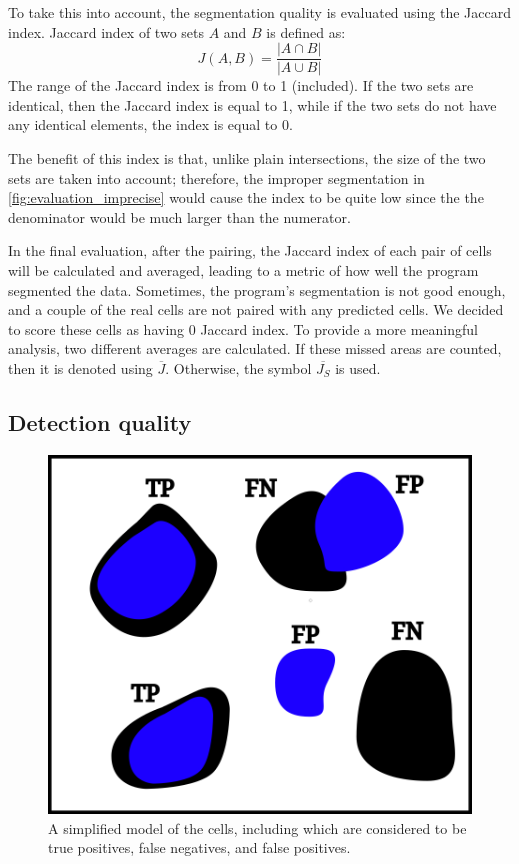 \documentclass[
  digital,     %
  oneside,     %
  nosansbold,  %
  nocolorbold, %
  lof,         %
  lot,         %
]{fithesis4}
\begin{document}
To take this into account, the segmentation quality is evaluated using the
Jaccard index. Jaccard index of two sets $A$ and $B$ is defined
as\cite{2020eelbode}:
$$J(A, B) = \frac{|A \cap B|}{|A \cup B|}$$
The range of the Jaccard index is from 0 to 1 (included). If the two sets are
identical, then the Jaccard index is equal to 1, while if the two sets do not
have any identical elements, the index is equal to 0.

The benefit of this index is that, unlike plain intersections, the size of the two
sets are taken into account; therefore, the improper segmentation in
\ref{fig:evaluation_imprecise} would cause the index to be quite low since the
the denominator would be much larger than the numerator.

In the final evaluation, after the pairing, the Jaccard index of each pair of
cells will be calculated and averaged, leading to a metric of how well the
program segmented the data. Sometimes, the program's segmentation is not good enough,
and a couple of the real cells are not paired with any predicted cells. We decided
to score these cells as having 0 Jaccard index. To provide a more meaningful analysis,
two different averages are calculated. If these missed areas are counted, then it
is denoted using $\overline{J}$. Otherwise, the symbol $\overline{J_S}$ is used.

\subsection{Detection quality}
\begin{figure}
    \begin{center}
        \includegraphics{resources/inkscape/evaluation_with_TP.png}
    \end{center}
    \caption{A simplified model of the cells, including which are considered to
    be true positives, false negatives, and false positives.}
    \label{fig:evaluation_with_TP}
\end{figure}
\end{document}
